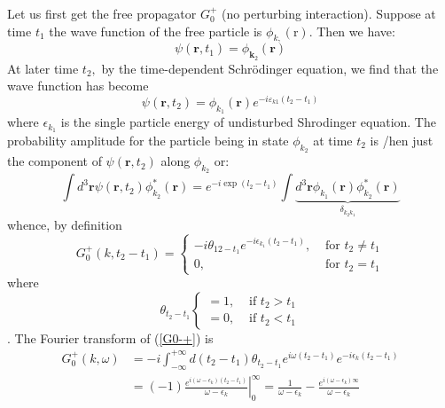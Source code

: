 Let us first get the free propagator $G_{0}^{+}$ (no perturbing interaction). Suppose at time $t_{1}$ the wave function of the free particle is $\phi_{k,}(\mathrm{r}) .$ Then we have:
$$\psi\left(\mathbf{r}, t_{1}\right)=\phi_{\mathbf{k}_{2}}(\mathbf{r})$$
At later time $t_{2},$ by the time-dependent Schrödinger equation, we find that the wave function has become
\begin{equation}\psi\left(\mathbf{r}, t_{2}\right)=\phi_{k_{1}}(\mathbf{r}) e^{-i \varepsilon_{k1}\left(t_{2}-t_{1}\right)}
\end{equation}
where $\epsilon_{k_{1}}$ is the single particle energy of undisturbed Shrodinger equation. The probability amplitude for the particle being in state $\phi_{k_{2}}$ at time $t_{2}$ is /hen just the component of $\psi\left(\mathbf{r}, t_{2}\right)$ along $\phi_{k_{2}}$ or:
\begin{equation}\int d^{3} \mathbf{r} \psi\left(\mathbf{r}, t_{2}\right) \phi_{k_{2}}^{*}(\mathbf{r})=e^{-i \exp \left(l_{2}-t_{1}\right)} \int \underbrace{d^{3} \mathbf{r} \phi_{k_{1}}(\mathbf{r}) \phi_{k_{2}}^{*}(\mathbf{r})}_{\delta_{k_{2} k_{1}}}\end{equation}
whence, by definition
\begin{equation}G_{0}^{+}\left(k, t_{2}-t_{1}\right)=\left\{\begin{array}{ll}
-i \theta_{12-t_{1}} e^{-i \epsilon_{k_1}\left(t_{2}-t_{1}\right)}, & \text { for } t_{2} \neq t_{1} \\
0, & \text { for } t_{2}=t_{1}
\end{array}\right.
\label{G0-+}
\end{equation}
where
$$\theta_{t_{2}-t_{1}}\left\{\begin{array}{ll}
=1, & \text { if } t_{2}>t_{1} \\
=0, & \text { if } t_{2}<t_{1}
\end{array}\right.$$
. The Fourier transform of (\ref{G0-+}) is
\begin{equation}\begin{aligned}
G_{0}^{+}(k, \omega) &=-i \int_{-\infty}^{+\infty} d\left(t_{2}-t_{1}\right) \theta_{t_{2}-t_{1}} e^{i \omega\left(t_{2}-t_{1}\right)} e^{-i \epsilon_{k}\left(t_{2}-t_{1}\right)} \\
&=\left.(-1) \frac{e^{i\left(\omega-\epsilon_{k}\right)\left(t_{2}-t_{1}\right)}}{\omega-\epsilon_{k}}\right|_{0} ^{\infty}=\frac{1}{\omega-\epsilon_{k}}-\frac{e^{i\left(\omega-\epsilon_{k}\right)\infty}}{\omega-\epsilon_{k}}
\end{aligned}
\label{G0-k-omega}
\end{equation}
